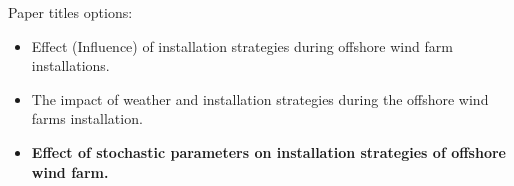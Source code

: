 Paper titles options:
\begin{itemize}
\item Effect (Influence) of installation strategies during offshore wind farm installations.
\item The impact of weather and installation strategies during the offshore wind farms installation.
\item \textbf{Effect of stochastic parameters on installation strategies of offshore wind farm.}
\end{itemize}